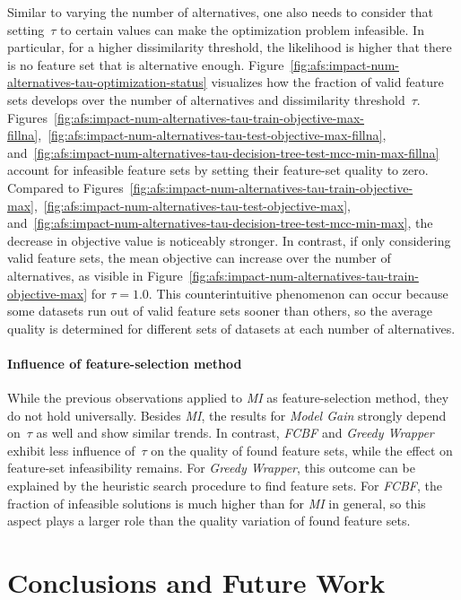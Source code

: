 \documentclass{article}
\theoremstyle{definition}
\begin{document}
Similar to varying the number of alternatives, one also needs to consider that setting~$\tau$ to certain values can make the optimization problem infeasible.
In particular, for a higher dissimilarity threshold, the likelihood is higher that there is no feature set that is alternative enough.
Figure~\ref{fig:afs:impact-num-alternatives-tau-optimization-status} visualizes how the fraction of valid feature sets develops over the number of alternatives and dissimilarity threshold~$\tau$.
Figures~\ref{fig:afs:impact-num-alternatives-tau-train-objective-max-fillna},~\ref{fig:afs:impact-num-alternatives-tau-test-objective-max-fillna}, and~\ref{fig:afs:impact-num-alternatives-tau-decision-tree-test-mcc-min-max-fillna} account for infeasible feature sets by setting their feature-set quality to zero.
Compared to Figures~\ref{fig:afs:impact-num-alternatives-tau-train-objective-max},~\ref{fig:afs:impact-num-alternatives-tau-test-objective-max}, and~\ref{fig:afs:impact-num-alternatives-tau-decision-tree-test-mcc-min-max}, the decrease in objective value is noticeably stronger.
In contrast, if only considering valid feature sets, the mean objective can increase over the number of alternatives, as visible in Figure~\ref{fig:afs:impact-num-alternatives-tau-train-objective-max} for $\tau=1.0$.
This counterintuitive phenomenon can occur because some datasets run out of valid feature sets sooner than others, so the average quality is determined for different sets of datasets at each number of alternatives.

\paragraph{Influence of feature-selection method}

While the previous observations applied to \emph{MI} as feature-selection method, they do not hold universally.
Besides \emph{MI}, the results for \emph{Model Gain} strongly depend on~$\tau$ as well and show similar trends.
In contrast, \emph{FCBF} and \emph{Greedy Wrapper} exhibit less influence of~$\tau$ on the quality of found feature sets, while the effect on feature-set infeasibility remains.
For \emph{Greedy Wrapper}, this outcome can be explained by the heuristic search procedure to find feature sets.
For \emph{FCBF}, the fraction of infeasible solutions is much higher than for \emph{MI} in general, so this aspect plays a larger role than the quality variation of found feature sets.

\section{Conclusions and Future Work}
\label{sec:afs:conclusion}
\end{document}
